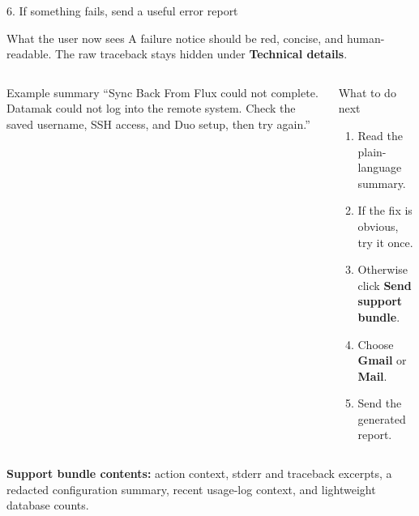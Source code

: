 \documentclass[aspectratio=169,11pt]{beamer}
\newcommand{\bad}[1]{\textcolor{ppplRed}{#1}}
\begin{document}
\begin{frame}{6. If something fails, send a useful error report}
  \small
  \begin{block}{What the user now sees}
    A failure notice should be \bad{red}, concise, and human-readable. The raw
    traceback stays hidden under \textbf{Technical details}.
  \end{block}

  \begin{columns}[T]
    \begin{alertblock}{Example summary}
      \small
      ``Sync Back From Flux could not complete. Datamak could not log into the
      remote system. Check the saved username, SSH access, and Duo setup, then
      try again.''
    \end{alertblock}

    \begin{block}{What to do next}
      \begin{enumerate}
        \item Read the plain-language summary.
        \item If the fix is obvious, try it once.
        \item Otherwise click \textbf{Send support bundle}.
        \item Choose \textbf{Gmail} or \textbf{Mail}.
        \item Send the generated report.
      \end{enumerate}
    \end{block}
  \end{columns}

  \smallskip
  {\footnotesize\textbf{Support bundle contents:} action context, stderr and
  traceback excerpts, a redacted configuration summary, recent usage-log
  context, and lightweight database counts.}
\end{frame}
\end{document}
